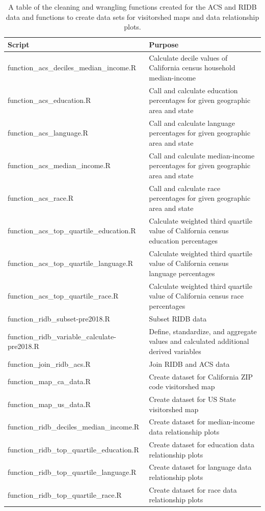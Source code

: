 \documentclass[
  11 pt,
  openany]{book}
\begin{document}
\begin{table}

\caption{\label{tab:func-table1}A table of the cleaning and wrangling functions created for the ACS and RIDB data and functions to create data sets for visitorshed maps and data relationship plots.}
\begin{tabular}[t]{l|l}
\hline
Script & Purpose\\
\hline
function\_acs\_deciles\_median\_income.R & Calculate decile values of California census household median-income\\
\hline
function\_acs\_education.R & Call and calculate education percentages for given geographic area and state\\
\hline
function\_acs\_language.R & Call and calculate language percentages for given geographic area and state\\
\hline
function\_acs\_median\_income.R & Call and calculate median-income percentages for given geographic area and state\\
\hline
function\_acs\_race.R & Call and calculate race percentages for given geographic area and state\\
\hline
function\_acs\_top\_quartile\_education.R & Calculate weighted third quartile value of California census education percentages\\
\hline
function\_acs\_top\_quartile\_language.R & Calculate weighted third quartile value of California census language percentages\\
\hline
function\_acs\_top\_quartile\_race.R & Calculate weighted third quartile value of California census race percentages\\
\hline
function\_ridb\_subset-pre2018.R & Subset RIDB data\\
\hline
function\_ridb\_variable\_calculate-pre2018.R & Define, standardize, and aggregate values and calculated additional derived variables\\
\hline
function\_join\_ridb\_acs.R & Join RIDB and ACS data\\
\hline
function\_map\_ca\_data.R & Create dataset for California ZIP code visitorshed map\\
\hline
function\_map\_us\_data.R & Create dataset for US State visitorshed map\\
\hline
function\_ridb\_deciles\_median\_income.R & Create dataset for median-income data relationship plots\\
\hline
function\_ridb\_top\_quartile\_education.R & Create dataset for education data relationship plots\\
\hline
function\_ridb\_top\_quartile\_language.R & Create dataset for language data relationship plots\\
\hline
function\_ridb\_top\_quartile\_race.R & Create dataset for race data relationship plots\\
\hline
\end{tabular}
\end{table}
\end{document}

